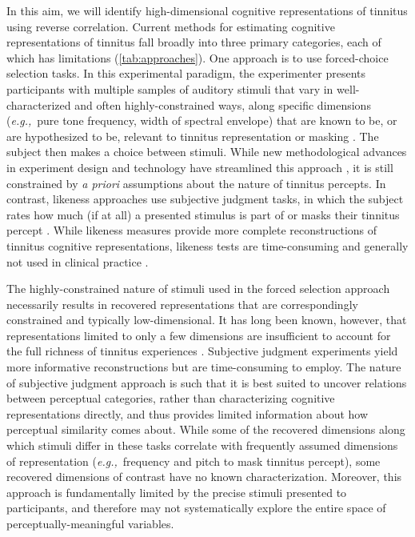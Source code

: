 \documentclass[11pt, notitlepage]{article} %
\def\eg{{\emph{e.g.,}}~}
\begin{document}
In this aim, we will identify high-dimensional cognitive representations of tinnitus using reverse correlation.
Current methods for estimating cognitive representations of tinnitus fall broadly into three primary categories,
each of which has limitations (\autoref{tab:approaches}).
One approach is to use forced-choice selection tasks.
In this experimental paradigm,
the experimenter presents participants with multiple samples of auditory stimuli that vary in well-characterized
and often highly-constrained ways, along specific dimensions (\eg pure tone frequency, width of spectral envelope)
that are known to be, or are hypothesized to be, relevant to tinnitus representation or masking
\cite{vajsakovicPrinciplesMethodsPsychoacoustic2021,henryMeasurementTinnitus2016}.
The subject then makes a choice between stimuli.
While new methodological advances in experiment design and technology have streamlined this approach
\cite{korthOneStepCloser2020,henryComputerautomatedTinnitusAssessment2004,henryComputerautomatedTinnitusAssessment2013},
it is still constrained by \emph{a priori} assumptions about the nature of tinnitus percepts.
In contrast, likeness approaches use subjective judgment tasks,
in which the subject rates how much (if at all) a presented stimulus is part of or masks their tinnitus percept
\cite{norenaPsychoacousticCharacterizationTinnitus2002}.
While likeness measures provide more complete reconstructions of tinnitus cognitive representations,
likeness tests are time-consuming and generally not used in clinical practice
\cite{vajsakovicPrinciplesMethodsPsychoacoustic2021}.

The highly-constrained nature of stimuli used in the forced selection approach necessarily results
in recovered representations that are correspondingly constrained and typically low-dimensional. It has
long been known, however, that representations limited to only a few dimensions are insufficient to
account for the full richness of tinnitus experiences
\cite{vajsakovicPrinciplesMethodsPsychoacoustic2021,henryMeasurementTinnitus2016}.
Subjective judgment experiments yield more informative reconstructions but are time-consuming to employ.
The nature of subjective judgment
approach is such that it is best suited to uncover relations between perceptual categories, rather than
characterizing cognitive representations directly, and thus provides limited information about how
perceptual similarity comes about. While some of the recovered dimensions along which stimuli differ in
these tasks correlate with frequently assumed dimensions of representation (\eg frequency and pitch to mask tinnitus percept),
some recovered dimensions of contrast have no known characterization.
Moreover, this approach is fundamentally limited by the precise stimuli presented to participants, and
therefore may not systematically explore the entire space of perceptually-meaningful variables.
\end{document}
